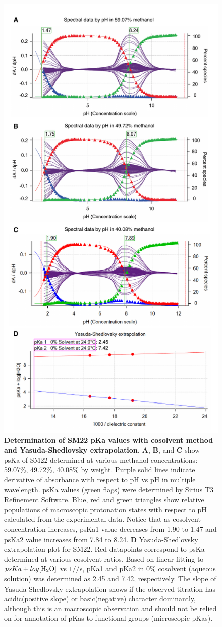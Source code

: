\documentclass[9pt,lineno]{elife}
\begin{document}
\begin{figure}
\begin{center}
\includegraphics[width=0.5\linewidth]{figures/SM22_cosolvent_extrapolation_fig}
\caption{{\bf Determination of SM22 pKa values with cosolvent method and Yasuda-Shedlovsky extrapolation.} 
\textbf{A}, \textbf{B}, and \textbf{C} show psKa of SM22 determined at various methanol concentrations: 59.07\%, 49.72\%, 40.08\% by weight.  Purple solid lines indicate derivative of absorbance with respect to pH vs pH in multiple wavelength. psKa values (green flags) were determined by Sirius T3 Refinement Software. Blue, red and green triangles show relative populations of macroscopic protonation states with respect to pH calculated from the experimental data. Notice that as cosolvent concentration increases, psKa1 value decreases from 1.90 to 1.47 and psKa2 value increases from 7.84 to 8.24. \textbf{D} Yasuda-Shedlovsky extrapolation plot for SM22. Red datapoints correspond to psKa determined at various cosolvent ratios. Based on linear fitting to $psKa + log [\ce{H2O}]$ vs $1//\epsilon$, pKa1 and pKa2 in 0\% cosolvent (aqueous solution) was determined as 2.45 and 7.42, respectively. The slope of Yasuda-Shedlovsky extrapolation shows if the observed titration has acidic(positive slope) or basic(negative) character dominantly, although this is an macroscopic observation and should not be relied on for annotation of pKas to functional groups (microscopic pKas).
} 
\label{fig:YS_extrapolation}
\end{center}
\end{figure}
\end{document}
